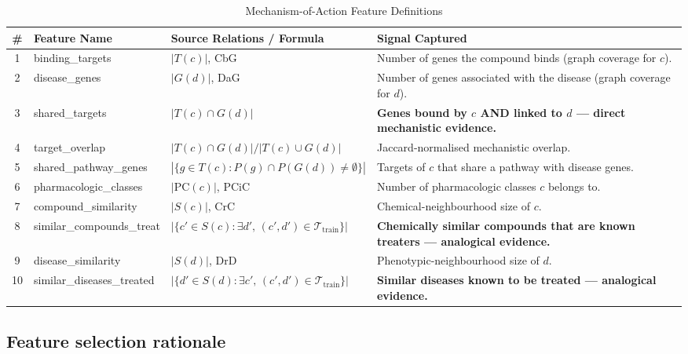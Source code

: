 \documentclass[twocolumn,10pt]{article}
\begin{document}
\begin{table}[t]
\centering
\caption{Mechanism-of-Action Feature Definitions}
\label{tab:moa}
\small
\setlength{\tabcolsep}{4pt}
\begin{tabularx}{\textwidth}{@{}c >{\ttfamily\raggedright\arraybackslash}p{} >{\raggedright\arraybackslash}p{} X@{}}
\toprule
\textbf{\#} & \textbf{Feature Name} & \textbf{Source Relations / Formula} & \textbf{Signal Captured} \\
\midrule
1 & binding\_targets & $|T(c)|$, CbG & Number of genes the compound binds (graph coverage for $c$). \\
2 & disease\_genes & $|G(d)|$, DaG & Number of genes associated with the disease (graph coverage for $d$). \\
3 & shared\_targets & $|T(c)\cap G(d)|$ & \textbf{Genes bound by $c$ AND linked to $d$ --- direct mechanistic evidence.} \\
4 & target\_overlap & $|T(c)\cap G(d)| / |T(c)\cup G(d)|$ & Jaccard-normalised mechanistic overlap. \\
5 & shared\_pathway\_genes & $|\{g\in T(c): P(g)\cap P(G(d))\ne\emptyset\}|$ & Targets of $c$ that share a pathway with disease genes. \\
6 & pharmacologic\_classes & $|\mathrm{PC}(c)|$, PCiC & Number of pharmacologic classes $c$ belongs to. \\
7 & compound\_similarity & $|S(c)|$, CrC & Chemical-neighbourhood size of $c$. \\
8 & similar\_compounds\_treat & $|\{c'\in S(c): \exists d',\, (c',d')\in\mathcal{T}_{\mathrm{train}}\}|$ & \textbf{Chemically similar compounds that are known treaters --- analogical evidence.} \\
9 & disease\_similarity & $|S(d)|$, DrD & Phenotypic-neighbourhood size of $d$. \\
10 & similar\_diseases\_treated & $|\{d'\in S(d): \exists c',\, (c',d')\in\mathcal{T}_{\mathrm{train}}\}|$ & \textbf{Similar diseases known to be treated --- analogical evidence.} \\
\bottomrule
\end{tabularx}
\end{table}

\subsection{Feature selection rationale}
\end{document}
